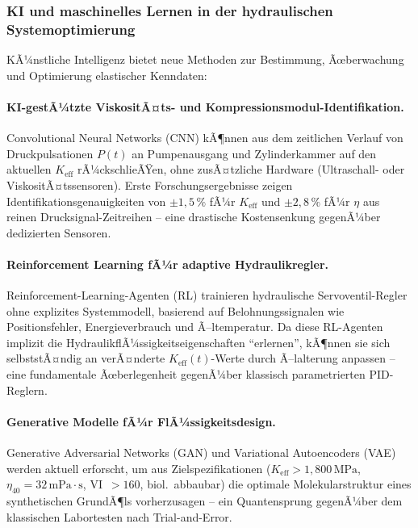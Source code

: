 ﻿\documentclass[a4paper,12pt]{scrreprt}
\theoremstyle{definition}
\begin{document}
\subsubsection{KI und maschinelles Lernen in der hydraulischen Systemoptimierung}

KÃ¼nstliche Intelligenz bietet neue Methoden zur Bestimmung,
Ãœberwachung und Optimierung elastischer Kenndaten:

\paragraph{KI-gestÃ¼tzte ViskositÃ¤ts- und Kompressionsmodul-Identifikation.}
Convolutional Neural Networks (CNN) kÃ¶nnen aus dem zeitlichen
Verlauf von Druckpulsationen $P(t)$ an Pumpenausgang und
Zylinderkammer auf den aktuellen $K_{\mathrm{eff}}$ rÃ¼ckschlieÃŸen,
ohne zusÃ¤tzliche Hardware (Ultraschall- oder ViskositÃ¤tssensoren).
Erste Forschungsergebnisse zeigen Identifikations\-genauigkeiten
von $\pm 1{,}5\,\%$ fÃ¼r $K_{\mathrm{eff}}$ und $\pm 2{,}8\,\%$
fÃ¼r $\eta$ aus reinen Drucksignal-Zeitreihen -- eine drastische
Kostensenkung gegenÃ¼ber dedizierten Sensoren.

\paragraph{Reinforcement Learning fÃ¼r adaptive Hydraulikregler.}
Reinforcement-Learning-Agenten (RL) trainieren hydraulische
Servoventil-Regler ohne explizites Systemmodell, basierend auf
Belohnungssignalen wie Positionsfehler, Energieverbrauch und
Ã–ltemperatur. Da diese RL-Agenten implizit die HydraulikflÃ¼ssigkeits\-eigenschaften
``erlernen'', kÃ¶nnen sie sich selbststÃ¤ndig an verÃ¤nderte
$K_{\mathrm{eff}}(t)$-Werte durch Ã–lalterung anpassen -- eine
fundamentale Ãœberlegenheit gegenÃ¼ber klassisch parametrierten PID-Reglern.

\paragraph{Generative Modelle fÃ¼r FlÃ¼ssigkeitsdesign.}
Generative Adversarial Networks (GAN) und Variational Autoencoders (VAE)
werden aktuell erforscht, um aus Zielspezifikationen
($K_{\mathrm{eff}} > 1{,}800\,\mathrm{MPa}$, $\eta_{40} = 32\,\mathrm{mPa\cdot s}$,
VI~$> 160$, biol.\ abbaubar) die optimale Molekularstruktur eines
synthetischen GrundÃ¶ls vorherzusagen -- ein Quantensprung gegenÃ¼ber
dem klassischen Labortesten nach Trial-and-Error.
\end{document}
